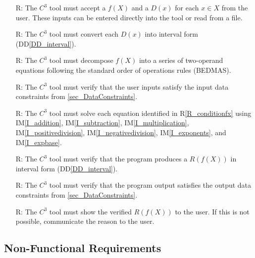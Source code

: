 \documentclass[12pt]{article}
\newcommand{\ddref}[1]{DD\ref{#1}}
\newcommand{\iref}[1]{IM\ref{#1}}
\newcounter{reqnum} %
\newcommand{\rref}[1]{R\ref{#1}}
\newcommand{\prognameAbbrv}{$C^{3}$}
\begin{document}
\noindent \begin{itemize}

\item[R\refstepcounter{reqnum}\thereqnum \label{R_Inputs}:] The 
\prognameAbbrv{} tool must accept a $f(X)$ and a $D(x)$ for each $x \in X$ from 
the user. These inputs can be entered directly into the tool or read from a 
file.

\item[R\refstepcounter{reqnum}\thereqnum \label{R_conditionX}:] The 
\prognameAbbrv{} tool must convert each $D(x)$ into interval form 
(\ddref{DD_interval}).

\item[R\refstepcounter{reqnum}\thereqnum \label{R_conditionfx}:] The 
\prognameAbbrv{} tool must decompose $f(X)$ into a series of two-operand 
equations following the standard order of operations rules (BEDMAS).

\item[R\refstepcounter{reqnum}\thereqnum \label{R_verifyinputs}:] The 
\prognameAbbrv{} tool must verify that the user inputs satisfy the input data 
constraints from \ref{sec_DataConstraints}.

\item[R\refstepcounter{reqnum}\thereqnum \label{R_Calculate}:] The 
\prognameAbbrv{} tool must solve each equation identified in 
\rref{R_conditionfx} using \iref{I_addition}, \iref{I_subtraction}, 
\iref{I_multiplication}, \iref{I_positivedivision}, \iref{I_negativedivision}, 
\iref{I_exponents}, and \iref{I_expbase}.

\item[R\refstepcounter{reqnum}\thereqnum \label{R_VerifyOutput}:] The 
\prognameAbbrv{} tool must verify that the program produces a $R(f(X))$ in 
interval form (\ddref{DD_interval}).

\item[R\refstepcounter{reqnum}\thereqnum \label{R_VerifyOutputConstraints}:] 
The \prognameAbbrv{} tool must verify that the program output satisfies the 
output data constraints from \ref{sec_DataConstraints}.

\item[R\refstepcounter{reqnum}\thereqnum \label{R_Output}:] The 
\prognameAbbrv{} tool must show the verified $R(f(X))$ to the user. If this is 
not possible, communicate the reason to the user.

\end{itemize}

\subsection{Non-Functional Requirements}
\end{document}
